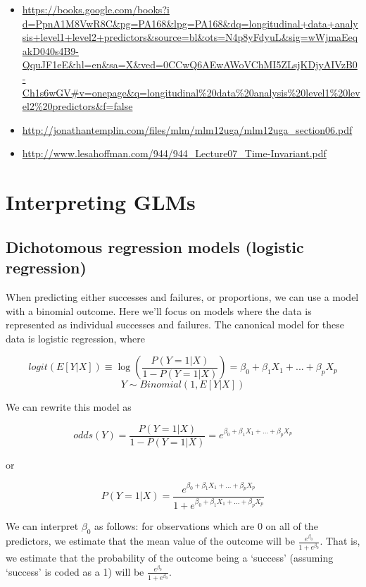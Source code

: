 \documentclass[
  letterpaper,
  DIV=11,
  numbers=noendperiod]{scrreprt}
\begin{document}
\begin{itemize}
\item
  \href{https://books.google.com/books?i\%20d=PpnA1M8VwR8C&pg=PA168&lpg=PA168&dq=longitudinal+data+analysis+level1+level2+predictors&source=bl&ots=N4p8yFdyuL&sig=wWjmaEeqakD040s4B9-QquJF1eE&hl=en&sa=X&ved=0CCwQ6AEwAWoVChMI5ZLsjKDjyAIVzB0-Ch1s6wGV\#v=onepage&q=longitudinal\%20data\%20analysis\%20level1\%20level2\%20predictors&f=false}{https://books.google.com/books?i
  d=PpnA1M8VwR8C\&pg=PA168\&lpg=PA168\&dq=longitudinal+data+analysis+level1+level2+predictors\&source=bl\&ots=N4p8yFdyuL\&sig=wWjmaEeqakD040s4B9-QquJF1eE\&hl=en\&sa=X\&ved=0CCwQ6AEwAWoVChMI5ZLsjKDjyAIVzB0-Ch1s6wGV\#v=onepage\&q=longitudinal\%20data\%20analysis\%20level1\%20level2\%20predictors\&f=false}
\item
  \url{http://jonathantemplin.com/files/mlm/mlm12uga/mlm12uga_section06.pdf}
\item
  \url{http://www.lesahoffman.com/944/944_Lecture07_Time-Invariant.pdf}
\end{itemize}

\chapter{Interpreting GLMs}\label{interpreting-glms}

\section{Dichotomous regression models (logistic
regression)}\label{dichotomous-regression-models-logistic-regression}

When predicting either successes and failures, or proportions, we can
use a model with a binomial outcome. Here we'll focus on models where
the data is represented as individual successes and failures. The
canonical model for these data is logistic regression, where

\[logit(E[Y|X]) \equiv \log\left(\frac{P(Y=1|X)}{1-P(Y=1|X)}\right) = \beta_0 + \beta_1X_1 + ... + \beta_pX_p\]
\[Y \sim Binomial(1, E[Y|X])\]

We can rewrite this model as

\[odds(Y) = \frac{P(Y=1|X)}{1-P(Y=1|X)} = e^{\beta_0 + \beta_1X_1 + ... + \beta_pX_p}\]

or

\[P(Y=1|X) = \frac{e^{\beta_0 + \beta_1X_1 + ... + \beta_pX_p}}{1 + e^{\beta_0 + \beta_1X_1 + ... + \beta_pX_p}}\]

We can interpret \(\beta_0\) as follows: for observations which are 0 on
all of the predictors, we estimate that the mean value of the outcome
will be \(\frac{e^{\beta_0}}{1 + e^{\beta_0}}\). That is, we estimate
that the probability of the outcome being a `success' (assuming
`success' is coded as a 1) will be
\(\frac{e^{\beta_0}}{1 + e^{\beta_0}}\).
\end{document}
